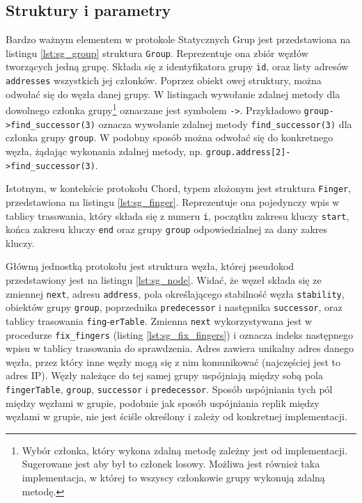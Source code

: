 \documentclass[12pt, twoside, openany]{report}
\begin{document}
\subsection{Struktury i parametry}

Bardzo ważnym elementem w protokole Statycznych Grup jest przedstawiona na listingu \ref{lst:sg_group} struktura \texttt{Group}. Reprezentuje ona zbiór węzłów tworzących jedną grupę. Składa się z identyfikatora grupy \texttt{id}, oraz listy adresów \texttt{addresses} wszystkich jej członków. Poprzez obiekt owej struktury, można odwołać się do węzła danej grupy. W listingach wywołanie zdalnej metody dla dowolnego członka grupy\footnote{Wybór członka, który wykona zdalną metodę zależny jest od implementacji. Sugerowane jest aby był to członek losowy. Możliwa jest również taka implementacja, w której to wszyscy członkowie grupy wykonują zdalną metodę.} oznaczane jest symbolem \texttt{->}. Przykładowo \texttt{group->find\_successor(3)} oznacza wywołanie zdalnej metody \texttt{find\_successor(3)} dla członka grupy \texttt{group}. W podobny sposób można odwołać się do konkretnego węzła, żądając wykonania zdalnej metody, np. \texttt{group.address[2]->find\_successor(3)}.

Istotnym, w kontekście protokołu Chord, typem złożonym jest struktura \texttt{Finger}, przedstawiona na listingu \ref{lst:sg_finger}. Reprezentuje ona pojedynczy wpis w tablicy trasowania, który składa się z numeru \texttt{i}, początku zakresu kluczy \texttt{start}, końca zakresu kluczy \texttt{end} oraz grupy \texttt{group} odpowiedzialnej za dany zakres kluczy.







Główną jednostką protokołu jest struktura węzła, której pseudokod przedstawiony jest na listingu \ref{lst:sg_node}. Widać, że węzeł składa się ze zmiennej \texttt{next}, adresu \texttt{address}, pola określającego stabilność węzła \texttt{stability}, obiektów grupy \texttt{group}, poprzednika \texttt{predecessor} i następnika \texttt{successor}, oraz tablicy trasowania \texttt{fing}-\texttt{erTable}. Zmienna \texttt{next} wykorzystywana jest w procedurze \texttt{fix\_fingers} (listing \ref{lst:sg_fix_fingers}) i oznacza indeks następnego wpisu w tablicy trasowania do sprawdzenia. Adres zawiera unikalny adres danego węzła, przez który inne węzły mogą się z nim komunikować (najczęściej jest to adres IP). Węzły należące do tej samej grupy uspójniają między sobą pola \texttt{fingerTable}, \texttt{group}, \texttt{successor} i \texttt{predecessor}. Sposób uspójniania tych pól między węzłami w grupie, podobnie jak sposób uspójniania replik między węzłami w grupie, nie jest ściśle określony i zależy od konkretnej implementacji.
\end{document}
